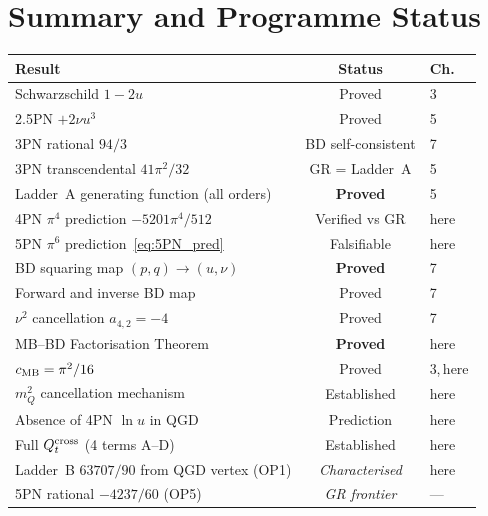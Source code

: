 \documentclass[11pt,a4paper]{article}
\theoremstyle{plain}
\theoremstyle{definition}
\theoremstyle{remark}
\begin{document}
\section{Summary and Programme Status}
\label{sec:summary}

\begin{center}
\renewcommand{\arraystretch}{1.45}
\begin{tabular}{p{7cm}cl}
\toprule
Result & Status & Ch. \\
\midrule
Schwarzschild $1-2u$ & Proved & 3 \\
2.5PN $+2\nu u^3$ & Proved & 5 \\
3PN rational $94/3$ & BD self-consistent & 7 \\
3PN transcendental $41\pi^2/32$ & GR = Ladder~A & 5 \\
Ladder~A generating function (all orders) & \textbf{Proved} & 5 \\
4PN $\pi^4$ prediction $-5201\pi^4/512$ & Verified vs GR & here \\
5PN $\pi^6$ prediction~\eqref{eq:5PN_pred} & Falsifiable & here \\
BD squaring map $(p,q)\to(u,\nu)$ & \textbf{Proved} & 7 \\
Forward and inverse BD map & Proved & 7 \\
$\nu^2$ cancellation $a_{4,2}=-4$ & Proved & 7 \\
MB--BD Factorisation Theorem & \textbf{Proved} & here \\
$c_{\rm MB} = \pi^2/16$ & Proved & 3,\,here \\
$m_Q^2$ cancellation mechanism & Established & here \\
Absence of 4PN $\ln u$ in QGD & Prediction & here \\
Full $Q_t^{\rm cross}$ (4 terms A--D) & Established & here \\
\midrule
Ladder~B $63707/90$ from QGD vertex (OP1) & \textit{Characterised} & here \\
5PN rational $-4237/60$ (OP5) & \textit{GR frontier} & --- \\
\bottomrule
\end{tabular}
\end{center}
\end{document}
